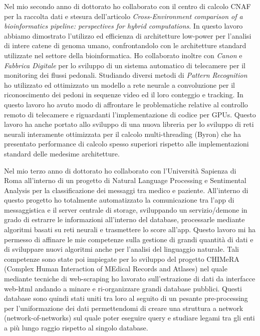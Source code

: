 \documentclass[a4paper,11pt]{article}
\begin{document}
Nel mio secondo anno di dottorato ho collaborato con il centro di calcolo CNAF per la raccolta dati e stesura dell'articolo \emph{Cross-Environment comparison of a bioinformatics pipeline: perspectives for hybrid computations}.
In questo lavoro abbiamo dimostrato l'utilizzo ed efficienza di architetture low-power per l'analisi di intere catene di genoma umano, confrontandolo con le architetture standard utilizzate nel settore della bioinformatica.
Ho collaborato inoltre con \emph{Canon} e \emph{Fabbrica Digitale} per lo sviluppo di un sistema automatico di telecamere per il monitoring dei flussi pedonali.
Studiando diversi metodi di \emph{Pattern Recognition} ho utilizzato ed ottimizzato un modello a rete neurale a convoluzione per il riconoscimento dei pedoni in sequenze video ed il loro conteggio e tracking.
In questo lavoro ho avuto modo di affrontare le problematiche relative al controllo remoto di telecamere e riguardanti l'implementazione di codice per GPUs.
Questo lavoro ha anche portato allo sviluppo di una nuova libreria per lo sviluppo di reti neurali interamente ottimizzata per il calcolo multi-threading (Byron) che ha presentato performance di calcolo spesso superiori rispetto alle implementazioni standard delle medesime architetture.

Nel mio terzo anno di dottorato ho collaborato con l'Università Sapienza di Roma all'interno di un progetto di Natural Language Processing e Sentimental Analysis per la classificazione dei messaggi tra medico e paziente.
All'interno di questo progetto ho totalmente automatizzato la comunicazione tra l'app di messaggistica e il server centrale di storage, sviluppando un servizio/demone in grado di estrarre le informazioni all'interno del database, processarle mediante algoritmi basati su reti neurali e trasmettere lo score all'app.
Questo lavoro mi ha permesso di affinare le mie competenze sulla gestione di grandi quantità di dati e di sviluppare nuovi algoritmi anche per l'analisi del linguaggio naturale.
Tali competenze sono state poi impiegate per lo sviluppo del progetto CHIMeRA (Complex Human Interaction of MEdical Records and Atlases) nel quale mediante tecniche di web-scraping ho lavorato sull'estrazione di dati da interfacce web-html andando a minare e ri-organizzare grandi database pubblici.
Questi database sono quindi stati uniti tra loro al seguito di un pesante pre-processing per l'uniformazione dei dati permettendomi di creare una struttura a network (network-of-networks) sul quale poter eseguire query e studiare legami tra gli enti a più lungo raggio rispetto al singolo database.
\end{document}
